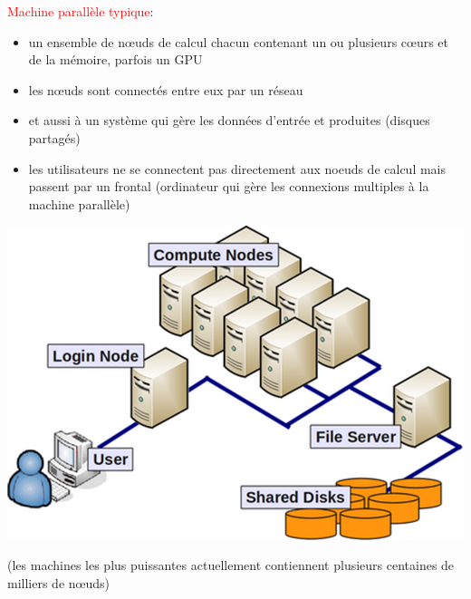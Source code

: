 \documentclass{beamer}
\begin{document}
\begin{frame}

\textcolor{red}{Machine parallèle typique}: 
\begin{itemize}
	\item un ensemble de n\oe uds de calcul chacun contenant un ou plusieurs cœurs et de la m\'emoire, parfois un GPU
	\item les nœuds sont connect\'es entre eux par un r\'eseau
	\item et aussi à un système qui gère les données d'entrée et produites (disques partagés)
	\item les utilisateurs ne se connectent pas directement aux noeuds de calcul mais passent par un frontal (ordinateur qui gère les connexions multiples à la machine parallèle)
\end{itemize}

\vfill
\begin{center}
\includegraphics[scale=0.14]{../Images/ParallelMachine.png}
\end{center}

(les machines les plus puissantes actuellement contiennent plusieurs centaines de milliers de n\oe uds)
\end{frame}
\end{document}
